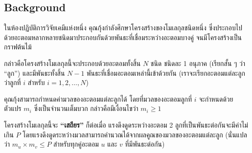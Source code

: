 
\subsection*{\sectionfont\upshape Background}

ในห้องปฏิบัติการวิจัยเคมีแห่งหนึ่ง\; คุณกุ้งกำลังศึกษาโครงสร้างของโมเลกุลชนิดหนึ่ง\;
ซึ่งประกอบไปด้วยอะตอมหลากหลายชนิดมาประกอบกันด้วยพันธะที่เชื่อมระหว่างอะตอมบางคู่ จนมีโครงสร้างเป็นกราฟต้นไม้

กล่าวคือโครงสร้างโมเลกุลนี้จะประกอบด้วยอะตอมทั้งสิ้น $N$ ชนิด ชนิดละ 1 อนุภาค (เรียกสั้น ๆ ว่า “ลูก”) 
และมีพันธะทั้งสิ้น $N-1$ พันธะที่เชื่อมอะตอมเหล่านี้เข้าด้วยกัน 
(เราจะเรียกอะตอมแต่ละลูกว่าลูกที่ $i$ สำหรับ $i = 1, 2, \ldots, N$)

คุณกุ้งสามารถกำหนดค่ามวลของอะตอมแต่ละลูกได้ โดยที่มวลของอะตอมลูกที่ $i$ จะกำหนดด้วยตัวแปร $m_i$ 
ซึ่งเป็นจำนวนเต็มบวก กล่าวคือมีเงื่อนไขว่า $m_i \geq 1$

โครงสร้างโมเลกุลนี้จะ \textbf{“เสถียร”} ก็ต่อเมื่อ แรงดึงดูดระหว่างอะตอม 2 ลูกที่เป็นพันธะต่อกันจะมีค่าไม่เกิน $P$ 
โดยแรงดึงดูดระหว่างมวลสามารถคำนวณได้จากผลคูณของมวลของอะตอมแต่ละลูก (นั่นแปลว่า $m_u \times m_v \leq P$ สำหรับทุกคู่อะตอม $u$ และ $v$ ที่มีพันธะต่อกัน)

